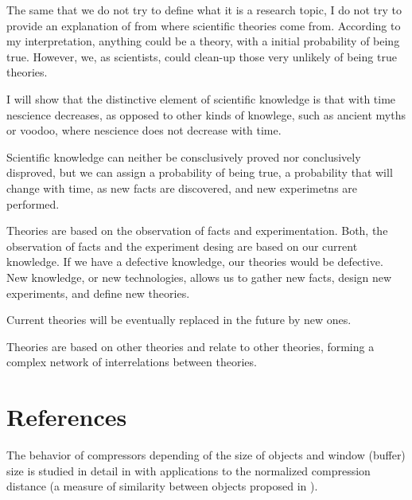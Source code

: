 The same that we do not try to define what it is a research topic, I do not try to provide an explanation of from where scientific theories come from. According to my interpretation, anything could be a theory, with a initial probability of being true. However, we, as scientists, could clean-up those very unlikely of being true theories.

I will show that the distinctive element of scientific knowledge is that with time nescience decreases, as opposed to other kinds of knowlege, such as ancient myths or voodoo, where nescience does not decrease with time.

Scientific knowledge can neither be consclusively proved nor conclusively disproved, but we can assign a probability of being true, a probability that will change with time, as new facts are discovered, and new experimetns are performed.

Theories are based on the observation of facts and experimentation. Both, the observation of facts and the experiment desing are based on our current knowledge. If we have a defective knowledge, our theories would be defective. New knowledge, or new technologies, allows us to gather new facts, design new experiments, and define new theories.

Current theories will be eventually replaced in the future by new ones.

Theories are based on other theories and relate to other theories, forming a complex network of interrelations between theories.


%
%

\section*{References}


The behavior of compressors depending of the size of objects and window (buffer) size is studied in detail in \cite{cebrian2005common} with applications to the normalized compression distance (a measure of similarity between objects proposed in \cite{li2004similarity}).


